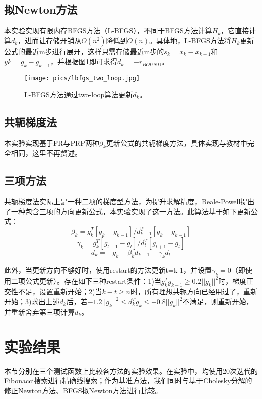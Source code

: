 \documentclass{article}
\begin{document}
\subsection{拟Newton方法}
本实验实现有限内存BFGS方法（L-BFGS），不同于BFGS方法计算$H_k$，它直接计算$d_k$，进而让存储开销从$O(n^2)$降低到$O(n)$。具体地，L-BFGS方法将$H_k$更新公式的最近m步进行展开，这样只需存储最近m步的$s_k = x_k - x_{k-1}$和$yk = g_k - g_{k-1}$，并根据图\ref{fig:lbfgs}即可求得$d_k = -r_{BOUND}$。

\begin{figure}[h]
  \centering
  \texttt{[image: pics/lbfgs\_two\_loop.jpg]}
  \caption{L-BFGS方法通过two-loop算法更新$d_k$。}
  \label{fig:lbfgs}
\end{figure}

\subsection{共轭梯度法}
本实验实现基于FR与PRP两种$\beta_k$更新公式的共轭梯度方法，具体实现与教材中完全相同，这里不再赘述。

\subsection{三项方法}
共轭梯度法实际上是一种二项的梯度型方法，为提升求解精度，Beale-Powell提出了一种包含三项的方向更新公式，本实验实现了这一方法。此算法基于如下更新公式：
\[ \beta_k = g_k^T [g_k - g_{k-1}] / d_{k-1}^T [g_k - g_{k-1}] \]
\[ \gamma_k = g_k^T [g_{t+1} - g_t] / d_t^T [g_{t+1} - g_t] \]
\[ d_k = -g_k + \beta_k d_{k-1} + \gamma_k d_{t} \]

此外，当更新方向不够好时，使用restart的方法更新t=k-1，并设置$\gamma_k=0$（即使用二项公式更新）。存在如下三种restart条件：1)当$g_k^T g_{k-1} \geq 0.2 ||g_k||^2$时，梯度正交性不足，设置重新开始；2)当$k-t\geq n$时，所有理想共轭方向已经用过了，重新开始；3)求出上述$d_k$后，若$-1.2||g_k||^2\leq d_k^T g_k\leq -0.8||g_k||^2$不满足，则重新开始，并重新舍弃第三项计算$d_k$。


\section{实验结果}
本节分别在三个测试函数上比较各方法的实验效果。在实验中，均使用20次迭代的Fibonacci搜索进行精确线搜索；作为基准方法，我们同时与基于Cholesky分解的修正Newton方法、BFGS拟Newton方法进行比较。
\end{document}
